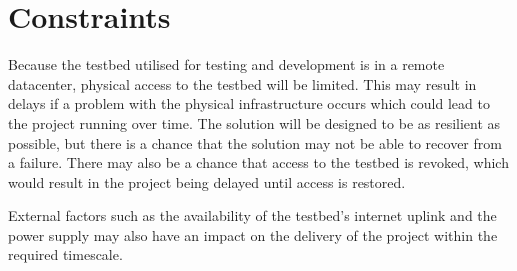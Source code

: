 \section{Constraints}
\label{intro:constraints}

Because the testbed utilised for testing and development is in a remote datacenter, physical access to the testbed will be limited.
This may result in delays if a problem with the physical infrastructure occurs which could lead to the project running over time.
The solution will be designed to be as resilient as possible, but there is a chance that the solution may not be able to recover from a failure.
There may also be a chance that access to the testbed is revoked, which would result in the project being delayed until access is restored.

External factors such as the availability of the testbed's internet uplink and the power supply may also have an impact on the delivery of the project within the required timescale.
